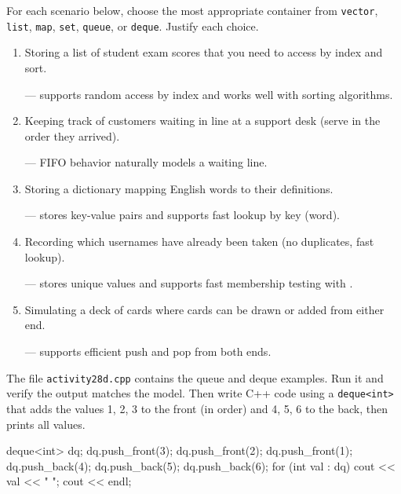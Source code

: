   \vskip -20pt

  \Q For each scenario below, choose the most appropriate container
    from {\tt vector}, {\tt list}, {\tt map}, {\tt set}, {\tt queue},
    or {\tt deque}.  Justify each choice.
    \begin{enumerate}
      \itemsep 12pt
      \item Storing a list of student exam scores that you need to
        access by index and sort.
        \begin{answer}[0.5in]
           --- supports random access by index and works
          well with sorting algorithms.
        \end{answer}

      \item Keeping track of customers waiting in line at a support desk
        (serve in the order they arrived).
        \begin{answer}[0.5in]
           --- FIFO behavior naturally models a waiting line.
        \end{answer}

      \item Storing a dictionary mapping English words to their
        definitions.
        \begin{answer}[0.5in]
           --- stores key-value pairs and supports fast lookup
          by key (word).
        \end{answer}

      \item Recording which usernames have already been taken (no
        duplicates, fast lookup).
        \begin{answer}[0.5in]
           --- stores unique values and supports fast
          membership testing with .
        \end{answer}

      \item Simulating a deck of cards where cards can be drawn or
        added from either end.
        \begin{answer}[0.5in]
           --- supports efficient push and pop from both
          ends.
        \end{answer}
    \end{enumerate}

  \vskip -10pt

  \Q The file {\tt activity28d.cpp} contains the queue and deque
    examples.  Run it and verify the output matches the model.
    Then write C++ code using a {\tt deque<int>} that adds the
    values 1, 2, 3 to the front (in order) and 4, 5, 6 to the
    back, then prints all values.
    \begin{answer}[1.25in]
      \begin{cpplst}
deque<int> dq;
dq.push_front(3);
dq.push_front(2);
dq.push_front(1);
dq.push_back(4);
dq.push_back(5);
dq.push_back(6);
for (int val : dq) {
    cout << val << " ";
}
cout << endl;
      \end{cpplst}
    \end{answer}
